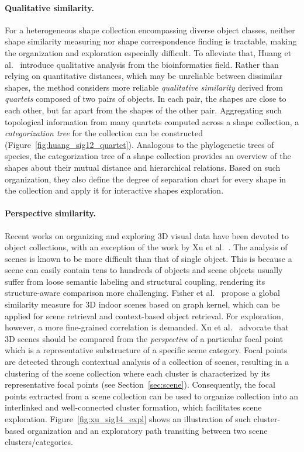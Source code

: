 \paragraph*{Qualitative similarity.}
For a heterogeneous shape collection encompassing diverse object classes, neither shape similarity measuring
nor shape correspondence finding is tractable, making the organization and exploration especially difficult.
To alleviate that, Huang et al.~\cite{Huang:2013:QOC} introduce qualitative analysis from the bioinformatics field.
Rather than relying on quantitative distances, which may be unreliable between dissimilar shapes,
the method considers more reliable \emph{qualitative similarity} derived from \emph{quartets} composed of two pairs of objects.
In each pair, the shapes are close to each other, but far apart from the shapes of the other pair.
Aggregating such topological information from many quartets computed across a shape collection, a \emph{categorization tree}
for the collection can be constructed (Figure~\ref{fig:huang_sig12_quartet}).
Analogous to the phylogenetic trees of species, the categorization tree of a shape collection provides an overview of the shapes
about their mutual distance and hierarchical relations.
Based on such organization, they also define the degree of separation chart for every shape in the collection
and apply it for interactive shapes exploration.

\paragraph*{Perspective similarity.}
Recent works on organizing and exploring 3D visual data have been devoted to object collections, with an exception
of the work by Xu et al.~\cite{Xu:2014:OHSC}. The analysis of scenes is known to be more difficult than that of single object.
This is because a scene can easily contain tens to hundreds of objects and scene objects usually suffer from loose
semantic labeling and structural coupling, rendering its structure-aware comparison more challenging.
Fisher et al.~ propose a global similarity measure for 3D indoor scenes based on graph kernel,
which can be applied for scene retrieval and context-based object retrieval. For exploration, however, a more fine-grained correlation is demanded.
%
Xu et al.~\cite{Xu:2014:OHSC} advocate that 3D scenes should be compared from the \emph{perspective} of a particular
focal point which is a representative substructure of a specific scene category.
Focal points are detected through contextual analysis of a collection of scenes, resulting in a clustering
of the scene collection where each cluster is characterized by its representative focal points (see Section~\ref{sec:scene}).
%
Consequently, the focal points extracted from a scene collection can be used to organize collection into an interlinked and well-connected cluster
formation, which facilitates scene exploration. Figure~\ref{fig:xu_sig14_expl} shows an illustration of such cluster-based organization
and an exploratory path transiting between two scene clusters/categories.


